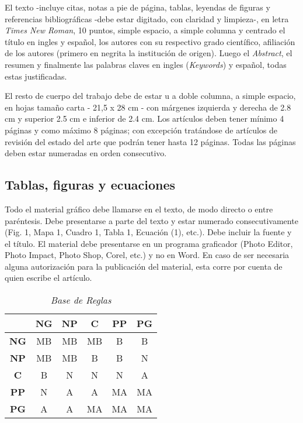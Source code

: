 \documentclass[10pt]{article}
\begin{document}
\begin{multicols}{2}
El texto -incluye citas, notas a pie de página, tablas, leyendas de figuras y referencias bibliográficas -debe estar digitado, con claridad y limpieza-, en letra \textit{Times New Roman}, 10 puntos, simple espacio, a simple columna y centrado el título en ingles y español, los autores con su respectivo grado científico, afiliación de los autores (primero en negrita la institución de origen). Luego el \textit{Abstract}, el resumen y finalmente las palabras claves en ingles (\textit{Keywords}) y español, todas estas justificadas.

El resto de cuerpo del trabajo debe de estar u a doble columna, a simple espacio, en hojas tamaño carta - 21,5 x 28 cm - con márgenes izquierda y derecha de 2.8 cm y superior 2.5 cm e inferior de 2.4 cm. Los artículos deben tener mínimo 4 páginas y como máximo 8 páginas; con excepción tratándose de artículos de revisión del estado del arte que podrán tener hasta 12 páginas. Todas las páginas deben estar numeradas en orden consecutivo.

\subsection{Tablas, figuras y ecuaciones}

Todo el material gráfico debe llamarse en el texto, de modo directo o entre paréntesis. Debe presentarse a parte del texto y estar numerado consecutivamente (Fig. 1, Mapa 1, Cuadro 1, Tabla 1, Ecuación (1), etc.). Debe incluir la fuente y el título. El material debe presentarse en un programa graficador (Photo Editor, Photo Impact, Photo Shop, Corel, etc.) y no en Word. En caso de ser necesaria alguna autorización para la publicación del material, esta corre por cuenta de quien escribe el artículo.

\begin{table}[H]
    \centering
    \caption{\textit{Base de Reglas}}
    \begin{tabular}{cccccc}
        \hline
         & \textbf{NG} & \textbf{NP} & \textbf{C} & \textbf{PP} & \textbf{PG} \\
        \hline
        \textbf{NG} & MB & MB & MB & B & B \\
        \textbf{NP} & MB & MB & B & B & N \\
        \textbf{C} & B & N & N & N & A \\
        \textbf{PP} & N & A & A & MA & MA \\
        \textbf{PG} & A & A & MA & MA & MA \\
        \hline
    \end{tabular}
    \label{tab:Base de Reglas}
\end{table}


\end{multicols}
\end{document}
